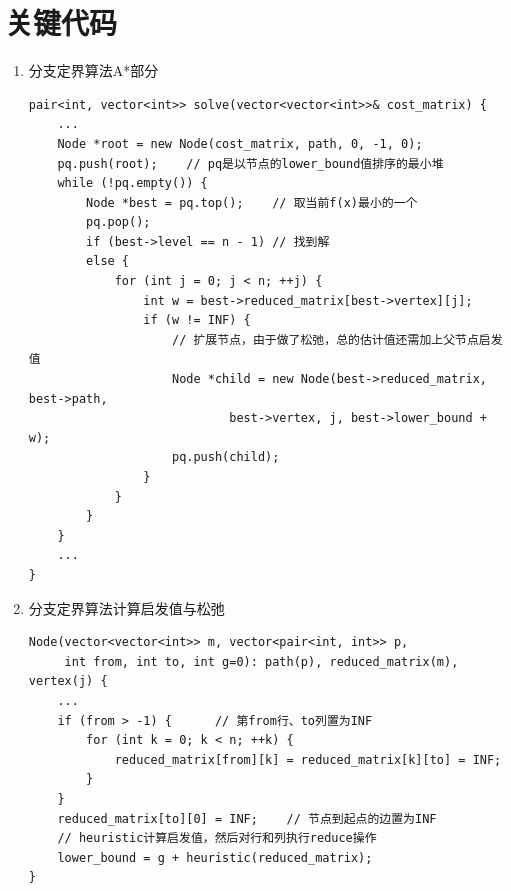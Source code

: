 \documentclass[10pt,letterpaper]{ctexart}
\begin{document}
\section{关键代码}
\begin{enumerate}[itemindent=2em,label=\arabic*、]
  \item 分支定界算法A*部分
  \begin{lstlisting}[caption=A*,label={code:read},captionpos=b]
pair<int, vector<int>> solve(vector<vector<int>>& cost_matrix) {
    ...
    Node *root = new Node(cost_matrix, path, 0, -1, 0);
    pq.push(root);    // pq是以节点的lower_bound值排序的最小堆
    while (!pq.empty()) {
        Node *best = pq.top();    // 取当前f(x)最小的一个
        pq.pop();
        if (best->level == n - 1) // 找到解
        else {
            for (int j = 0; j < n; ++j) {
                int w = best->reduced_matrix[best->vertex][j];
                if (w != INF) {
                    // 扩展节点，由于做了松弛，总的估计值还需加上父节点启发值
                    Node *child = new Node(best->reduced_matrix, best->path,
                            best->vertex, j, best->lower_bound + w);
                    pq.push(child);
                }
            }
        }
    }
    ...
}
  \end{lstlisting}

  \item 分支定界算法计算启发值与松弛
  \begin{lstlisting}[caption=创建节点,label={code:read},captionpos=b]
Node(vector<vector<int>> m, vector<pair<int, int>> p,
     int from, int to, int g=0): path(p), reduced_matrix(m), vertex(j) {
    ...
    if (from > -1) {      // 第from行、to列置为INF
        for (int k = 0; k < n; ++k) {
            reduced_matrix[from][k] = reduced_matrix[k][to] = INF;
        }
    }
    reduced_matrix[to][0] = INF;    // 节点到起点的边置为INF
    // heuristic计算启发值，然后对行和列执行reduce操作
    lower_bound = g + heuristic(reduced_matrix);
}
  \end{lstlisting}
\end{enumerate}
\end{document}
